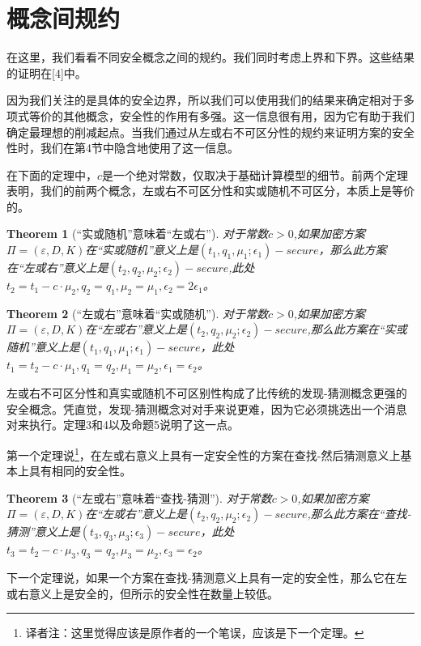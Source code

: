 \documentclass[]{article}
\newtheorem{theorem}{Theorem}
\begin{document}
\section{概念间规约}
在这里，我们看看不同安全概念之间的规约。我们同时考虑上界和下界。这些结果的证明在[4]中。

因为我们关注的是具体的安全边界，所以我们可以使用我们的结果来确定相对于多项式等价的其他概念，安全性的作用有多强。这一信息很有用，因为它有助于我们确定最理想的削减起点。当我们通过从左或右不可区分性的规约来证明方案的安全性时，我们在第4节中隐含地使用了这一信息。

在下面的定理中，$c$是一个绝对常数，仅取决于基础计算模型的细节。前两个定理表明，我们的前两个概念，左或右不可区分性和实或随机不可区分，本质上是等价的。

\begin{theorem}[“实或随机”意味着“左或右”]
	对于常数$c>0$,如果加密方案$\Pi=(\varepsilon,D,K)$在“实或随机”意义上是$(t_1,q_1,\mu_1;\epsilon_1)-secure$，那么此方案在“左或右”意义上是$(t_2,q_2,\mu_2;\epsilon_2)-secure$,此处$t_2=t_1-c\cdot \mu_2,q_2=q_1,\mu_2=\mu_1,\epsilon_2=2\epsilon_1$。
\end{theorem}

\begin{theorem}[“左或右”意味着“实或随机”]
	对于常数$c>0$,如果加密方案$\Pi=(\varepsilon,D,K)$在“左或右”意义上是$(t_2,q_2,\mu_2;\epsilon_2)-secure$,那么此方案在“实或随机”意义上是$(t_1,q_1,\mu_1;\epsilon_1)-secure$，此处$t_1=t_2-c\cdot \mu_1,q_1=q_2,\mu_1=\mu_2,\epsilon_1=\epsilon_2$。
\end{theorem}

左或右不可区分性和真实或随机不可区别性构成了比传统的发现-猜测概念更强的安全概念。凭直觉，发现-猜测概念对对手来说更难，因为它必须挑选出一个消息对来执行。定理3和4以及命题5说明了这一点。

第一个定理说\footnote{译者注：这里觉得应该是原作者的一个笔误，应该是下一个定理。}，在左或右意义上具有一定安全性的方案在查找-然后猜测意义上基本上具有相同的安全性。

\begin{theorem}[“左或右”意味着“查找-猜测”]
	对于常数$c>0$,如果加密方案$\Pi=(\varepsilon,D,K)$在“左或右”意义上是$(t_2,q_2,\mu_2;\epsilon_2)-secure$,那么此方案在“查找-猜测”意义上是$(t_3,q_3,\mu_3;\epsilon_3)-secure$，此处$t_3=t_2-c\cdot \mu_3,q_3=q_2,\mu_3=\mu_2,\epsilon_3=\epsilon_2$。
\end{theorem}

下一个定理说，如果一个方案在查找-猜测意义上具有一定的安全性，那么它在左或右意义上是安全的，但所示的安全性在数量上较低。
\end{document}
